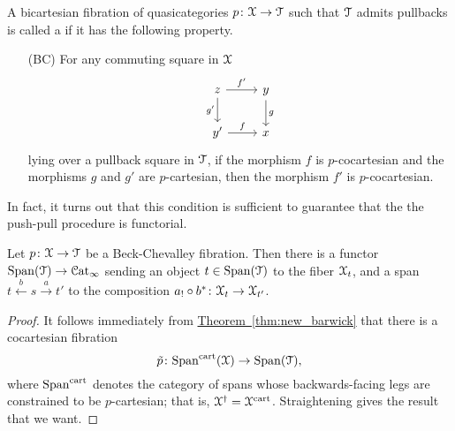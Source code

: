 \documentclass[main.tex]{subfiles}
\begin{document}
\begin{definition}
  \label{def:beck_chevalley_fibration}
  A bicartesian fibration of quasicategories $p\colon \mathcal{X} \to \mathcal{T}$ such that $\mathcal{T}$ admits pullbacks is called a  if it has the following property.
  \begin{itemize}
    \item[(BC)]\label{item:beck_chevalley_condition} For any commuting square in $\mathcal{X}$
      \begin{equation*}
        \begin{tikzcd}
          z
          \arrow[r, "f'"]
          \arrow[d, swap, "g'"]
          & y
          \arrow[d, "g"]
          \\
          y'
          \arrow[r, "f"]
          & x
        \end{tikzcd}
      \end{equation*}
      lying over a pullback square in $\mathcal{T}$, if the morphism $f$ is $p$-cocartesian and the morphisms $g$ and $g'$ are $p$-cartesian, then the morphism $f'$ is $p$-cocartesian.
  \end{itemize}
\end{definition}

In fact, it turns out that this condition is sufficient to guarantee that the the push-pull procedure is functorial.

\begin{proposition}
  Let $p\colon \mathcal{X} \to \mathcal{T}$ be a Beck-Chevalley fibration. Then there is a functor $\mathrm{Span}(\mathcal{T}) \to \mathcal{C}\mathrm{at}_{\infty}$ sending an object $t \in \mathrm{Span}(\mathcal{T})$ to the fiber $\mathcal{X}_{t}$, and a span $t \overset{b}{\leftarrow} s \overset{a}{\rightarrow} t'$ to the composition $a_{!} \circ b^{*}\colon \mathcal{X}_{t} \to \mathcal{X}_{t'}$.
\end{proposition}
\begin{proof}
  It follows immediately from \hyperref[thm:new_barwick]{Theorem~\ref*{thm:new_barwick}} that there is a cocartesian fibration
  \begin{equation*}
    \tilde{p}\colon \mathrm{Span}^{\mathrm{cart}}(\mathcal{X}) \to \mathrm{Span}(\mathcal{T}),
  \end{equation*}
  where $\mathrm{Span}^{\mathrm{cart}}$ denotes the category of spans whose backwards-facing legs are constrained to be $p$-cartesian; that is, $\mathcal{X}^{\dagger} = \mathcal{X}^{\mathrm{cart}}$. Straightening gives the result that we want.
\end{proof}
\end{document}
